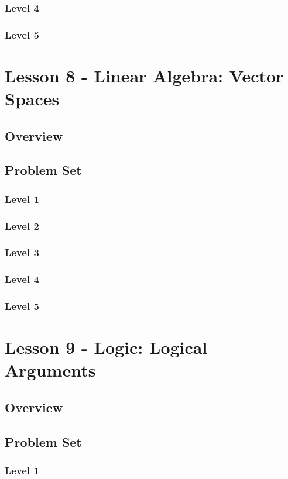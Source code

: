 \documentclass{article}
\begin{document}
\subsubsection{Level 4}
\subsubsection{Level 5}
\pagebreak

\section{Lesson 8 - Linear Algebra: Vector Spaces}
\subsection{Overview}
\subsection{Problem Set}
\subsubsection{Level 1}
\subsubsection{Level 2}
\subsubsection{Level 3}
\subsubsection{Level 4}
\subsubsection{Level 5}
\pagebreak

\section{Lesson 9 - Logic: Logical Arguments}
\subsection{Overview}
\subsection{Problem Set}
\subsubsection{Level 1}
\end{document}
